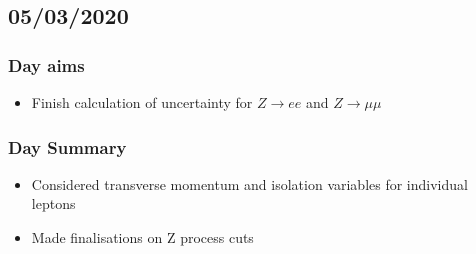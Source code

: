 \subsection*{05/03/2020}
\subsubsection{Day aims}
\begin{itemize}
    \item Finish calculation of uncertainty for $Z \rightarrow ee$ and $Z \rightarrow \mu\mu$
\end{itemize}

\subsubsection{Day Summary}
\begin{itemize}
    \item Considered transverse momentum and isolation variables for individual leptons
    \item Made finalisations on Z process cuts
    
\end{itemize}
